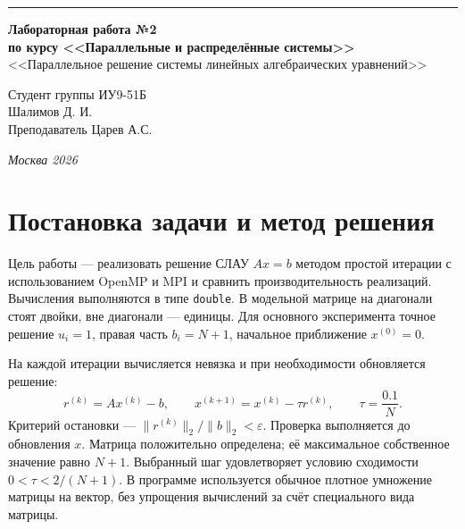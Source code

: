 \documentclass[a4paper,14pt]{extarticle}
\begin{document}
\begin{titlepage}
\vspace*{-16pt}
\hspace{30pt}\rule{0.866\textwidth}{0.4pt}

\vspace{11em}

\begin{center}
\Large \textbf{Лабораторная работа №2} \\
\large \textbf{по курсу <<Параллельные и распределённые системы>>} \\
\large <<Параллельное решение системы линейных алгебраических уравнений>>
\end{center}

\normalsize

\vspace{8em}

\begin{flushright}
Студент группы ИУ9-51Б \\
Шалимов Д. И. \\
\vspace{2ex}
Преподаватель Царев А.С.
\end{flushright}

\bigskip
\vfill

\begin{center}
\textsl{Москва 2026}
\end{center}
\end{titlepage}

\setcounter{page}{2}
\tableofcontents
\newpage



\section{Постановка задачи и метод решения}
Цель работы --- реализовать решение СЛАУ $Ax=b$ методом простой итерации
с использованием OpenMP и MPI и сравнить производительность реализаций.
Вычисления выполняются в типе \texttt{double}. В модельной матрице
на диагонали стоят двойки, вне диагонали --- единицы.
Для основного эксперимента точное решение $u_i=1$, правая часть $b_i=N+1$,
начальное приближение $x^{(0)}=0$.

На каждой итерации вычисляется невязка и при необходимости обновляется решение:
\[
 r^{(k)}=Ax^{(k)}-b,\qquad
 x^{(k+1)}=x^{(k)}-\tau r^{(k)},\qquad \tau=\frac{0.1}{N}.
\]
Критерий остановки --- $\|r^{(k)}\|_2/\|b\|_2<\varepsilon$.
Проверка выполняется до обновления $x$.
Матрица положительно определена; её максимальное собственное значение равно
$N+1$. Выбранный шаг удовлетворяет условию сходимости $0<\tau<2/(N+1)$.
В программе используется обычное плотное умножение матрицы на вектор,
без упрощения вычислений за счёт специального вида матрицы.
\end{document}
